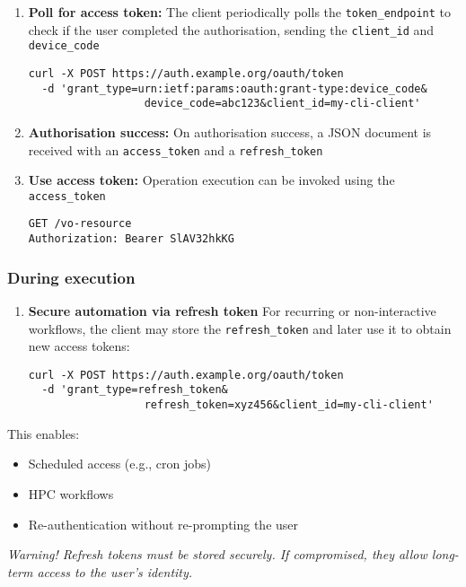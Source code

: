 \documentclass[11pt,a4paper]{ivoa}
\begin{document}
\begin{enumerate}
\item{\textbf{Poll for access token:} The client periodically polls the \verb|token_endpoint|
to check if the user completed the authorisation, sending the \verb|client_id| and \verb|device_code|
\begin{verbatim}
curl -X POST https://auth.example.org/oauth/token
  -d 'grant_type=urn:ietf:params:oauth:grant-type:device_code&
                  device_code=abc123&client_id=my-cli-client'
\end{verbatim}}

\item{\textbf{Authorisation success:} On authorisation success, a JSON document is received with an \verb|access_token|
and a \verb|refresh_token|}

\item{\textbf{Use access token:} Operation execution can be invoked using the \verb|access_token|
\begin{verbatim}
GET /vo-resource
Authorization: Bearer SlAV32hkKG
\end{verbatim}}
\end{enumerate}

\subsubsection{During execution}
\begin{enumerate}
\item{\textbf{Secure automation via refresh token}
For recurring or non-interactive workflows, the client may store the \verb|refresh_token| and later use it to obtain new access tokens:
\begin{verbatim}
curl -X POST https://auth.example.org/oauth/token
  -d 'grant_type=refresh_token&
                  refresh_token=xyz456&client_id=my-cli-client'
\end{verbatim}}
\end{enumerate}

This enables:
\begin{itemize}
\item Scheduled access (e.g., cron jobs)
\item HPC workflows
\item Re-authentication without re-prompting the user
\end{itemize}

\textit{Warning! Refresh tokens must be stored securely. If compromised, they allow long-term access to the user’s identity.}
\end{document}
